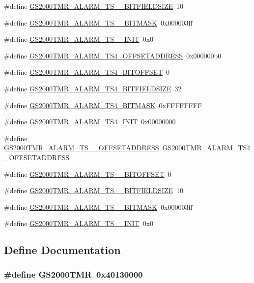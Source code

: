 \begin{DoxyCompactItemize}
\#define \hyperlink{a00556_a020bdba3bd5034e5cf1ce54db93386cd}{GS2000TMR\_\-ALARM\_\-TS\_\_\-BITFIELDSIZE}~10
\item 
\#define \hyperlink{a00556_a51f629cbdc5714284672e5368699d458}{GS2000TMR\_\-ALARM\_\-TS\_\_\-BITMASK}~0x000003ff
\item 
\#define \hyperlink{a00556_ab523305df883c92cfb486fab5b4d33c9}{GS2000TMR\_\-ALARM\_\-TS\_\_\-INIT}~0x0
\item 
\#define \hyperlink{a00556_a885eaf496b25f8286d5341903733e751}{GS2000TMR\_\-ALARM\_\-TS4\_\-OFFSETADDRESS}~0x000000b0
\item 
\#define \hyperlink{a00556_a485a3887470c69bf88ace2421ae608b1}{GS2000TMR\_\-ALARM\_\-TS4\_\-BITOFFSET}~0
\item 
\#define \hyperlink{a00556_a7f395daca9e43b7582b0c2012c56dd80}{GS2000TMR\_\-ALARM\_\-TS4\_\-BITFIELDSIZE}~32
\item 
\#define \hyperlink{a00556_af9b5cc853f01e26ba509461557cca135}{GS2000TMR\_\-ALARM\_\-TS4\_\-BITMASK}~0xFFFFFFFF
\item 
\#define \hyperlink{a00556_ad7af5252ba972487b5ba298fec51ceb4}{GS2000TMR\_\-ALARM\_\-TS4\_\-INIT}~0x00000000
\item 
\#define \hyperlink{a00556_af9650d4172c22219d19f5db51da51d23}{GS2000TMR\_\-ALARM\_\-TS\_\_\-OFFSETADDRESS}~GS2000TMR\_\-ALARM\_\-TS4\_\-OFFSETADDRESS
\item 
\#define \hyperlink{a00556_a81c75afc39f6c0e07a00a08ada7ffe43}{GS2000TMR\_\-ALARM\_\-TS\_\_\-BITOFFSET}~0
\item 
\#define \hyperlink{a00556_a498838001ffc8a6a7aaae4acd130f7ed}{GS2000TMR\_\-ALARM\_\-TS\_\_\-BITFIELDSIZE}~10
\item 
\#define \hyperlink{a00556_aa84e10a9df6fb930e3287384b4deac61}{GS2000TMR\_\-ALARM\_\-TS\_\_\-BITMASK}~0x000003ff
\item 
\#define \hyperlink{a00556_a70ed76d05f7d6b0b753df9fb0256bbb3}{GS2000TMR\_\-ALARM\_\-TS\_\_\-INIT}~0x0
\end{DoxyCompactItemize}


\subsection{Define Documentation}
\hypertarget{a00556_ab36d4df87832018e11a45e11a5545dd5}{
\subsubsection[{GS2000TMR}]{\setlength{\rightskip}{0pt plus 5cm}\#define GS2000TMR~0x40130000}}
\label{a00556_ab36d4df87832018e11a45e11a5545dd5}


